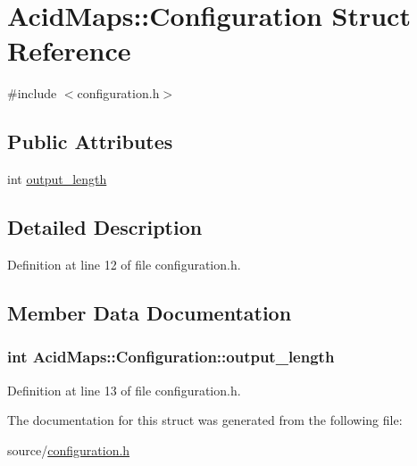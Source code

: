 \hypertarget{struct_acid_maps_1_1_configuration}{
\section{AcidMaps::Configuration Struct Reference}
\label{struct_acid_maps_1_1_configuration}
}


{\ttfamily \#include $<$configuration.h$>$}

\subsection*{Public Attributes}
\begin{DoxyCompactItemize}
\item 
int \hyperlink{struct_acid_maps_1_1_configuration_a01e74ee0e2acc5cc0339762a1ecb3397}{output\_\-length}
\end{DoxyCompactItemize}


\subsection{Detailed Description}


Definition at line 12 of file configuration.h.



\subsection{Member Data Documentation}
\hypertarget{struct_acid_maps_1_1_configuration_a01e74ee0e2acc5cc0339762a1ecb3397}{
\subsubsection[{output\_\-length}]{\setlength{\rightskip}{0pt plus 5cm}int {\bf AcidMaps::Configuration::output\_\-length}}}
\label{struct_acid_maps_1_1_configuration_a01e74ee0e2acc5cc0339762a1ecb3397}


Definition at line 13 of file configuration.h.



The documentation for this struct was generated from the following file:\begin{DoxyCompactItemize}
\item 
source/\hyperlink{configuration_8h}{configuration.h}\end{DoxyCompactItemize}
